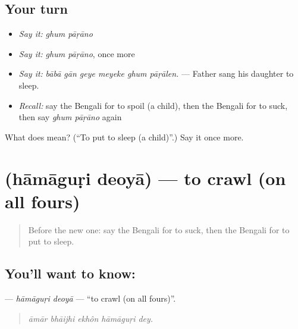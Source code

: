 \subsection*{Your turn}
\begin{itemize}
\raggedright
  \item \emph{Say it:} \emph{ghum pāṛāno}
  \item \emph{Say it:} \emph{ghum pāṛāno}, once more
  \item \emph{Say it:} \emph{bābā gān geye meyeke ghum pāṛālen.} — Father sang his daughter to sleep.
  \item \emph{Recall:} say the Bengali for to spoil (a child), then the Bengali for to suck, then say \emph{ghum pāṛāno} again
\end{itemize}

\begin{tcolorbox}[breakable,colback=teal!4,colframe=teal!35!black,title={Before you move on}]
What does   mean? (\textquotedblleft{}To put to sleep (a child)\textquotedblright{}.) Say it once more.
\end{tcolorbox}
\section[\texorpdfstring{\bn{হামাগুড়ি} \bn{দেওয়া} (hāmāguṛi deoyā)}{হামাগুড়ি দেওয়া (hāmāguṛi deoyā)}]{  (hāmāguṛi deoyā) — to crawl (on all fours)}

\label{lesson:BN-C486-hamaguri-deoya}



\begin{quote}
Before the new one: say the Bengali for to suck, then the Bengali for to put to sleep.
\end{quote}

\subsection*{You'll want to know:  }
\textbf{ } — \emph{hāmāguṛi deoyā} — \textquotedblleft{}to crawl (on all fours)\textquotedblright{}.

\begin{quote}
    
\end{quote}

\begin{quote}
\emph{āmār bhāijhi ekhôn hāmāguṛi dey.}
\end{quote}

